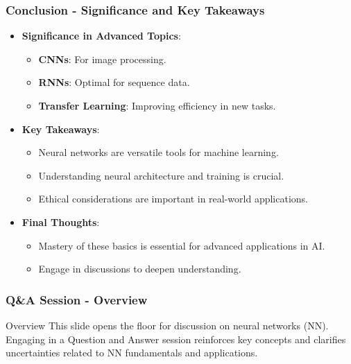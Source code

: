 \documentclass[aspectratio=169]{beamer}
\begin{document}
\begin{frame}[fragile]
    \frametitle{Conclusion - Significance and Key Takeaways}
    \begin{itemize}
        \item \textbf{Significance in Advanced Topics}:
        \begin{itemize}
            \item \textbf{CNNs}: For image processing.
            \item \textbf{RNNs}: Optimal for sequence data.
            \item \textbf{Transfer Learning}: Improving efficiency in new tasks.
        \end{itemize}

        \item \textbf{Key Takeaways}:
        \begin{itemize}
            \item Neural networks are versatile tools for machine learning.
            \item Understanding neural architecture and training is crucial.
            \item Ethical considerations are important in real-world applications.
        \end{itemize}

        \item \textbf{Final Thoughts}:
        \begin{itemize}
            \item Mastery of these basics is essential for advanced applications in AI.
            \item Engage in discussions to deepen understanding.
        \end{itemize}
    \end{itemize}
\end{frame}

\begin{frame}[fragile]
    \frametitle{Q\&A Session - Overview}
    \begin{block}{Overview}
        This slide opens the floor for discussion on neural networks (NN). 
        Engaging in a Question and Answer session reinforces key concepts and clarifies uncertainties related to NN fundamentals and applications.
    \end{block}
\end{frame}
\end{document}

